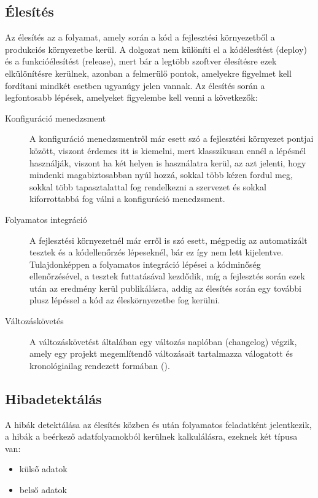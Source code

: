 \subsection*{Élesítés}
Az élesítés az a folyamat, amely során a kód a fejlesztési környezetből a produkciós környezetbe kerül. A dolgozat nem különíti el a kódélesítést (deploy) és a funkcióélesítést (release), mert bár a legtöbb szoftver élesítésre ezek elkülönítésre kerülnek, azonban a felmerülő pontok, amelyekre figyelmet kell fordítani mindkét esetben ugyanúgy jelen vannak. Az élesítés során a legfontosabb lépések, amelyeket figyelembe kell venni a következők:
\begin{description}
  \item[Konfiguráció menedzsment]
  A konfiguráció menedzsmentről már esett szó a fejlesztési környezet pontjai között, viszont érdemes itt is kiemelni, mert klasszikusan ennél a lépésnél használják, viszont ha két helyen is használatra kerül, az azt jelenti, hogy mindenki magabiztosabban nyúl hozzá, sokkal több kézen fordul meg, sokkal több tapasztalattal fog rendelkezni a szervezet és sokkal kiforrottabbá fog válni a konfiguráció menedzsment.
  \item[Folyamatos integráció]
  A fejlesztési környezetnél már erről is szó esett, mégpedig az automatizált tesztek és a kódellenőrzés lépeseknél, bár ez így nem lett kijelentve. Tulajdonképpen a folyamatos integráció lépései a kódminőség ellenőrzésével, a tesztek futtatásával kezdődik, míg a fejlesztés során ezek után az eredmény kerül publikálásra, addig az élesítés során egy további plusz lépéssel a kód az éleskörnyezetbe fog kerülni.
  \item[Változáskövetés]
  A változáskövetést általában egy változás naplóban (changelog) végzik, amely egy projekt megemlítendő változásait tartalmazza válogatott és kronológiailag rendezett formában (\cite{keep_a_changelog}).
\end{description}

\subsection*{Hibadetektálás}
A hibák detektálása az élesítés közben és után folyamatos feladatként jelentkezik, a hibák a beérkező adatfolyamokból kerülnek kalkulálásra, ezeknek két típusa van:
\begin{itemize}
  \item külső adatok
  \item belső adatok
\end{itemize}


